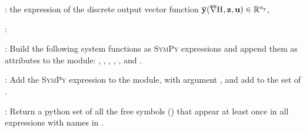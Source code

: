 \documentclass[10pt,a4paper]{article}
\begin{document}
\begin{description}
\begin{description}
\item {}: the expression of the discrete output vector function $\overline{{\mathbf{y}}}(\overline{\nabla}{\mathrm{H}}_{\mathtt{}}, {\mathbf{z}}, {\mathbf{u}})\in\mathbb{R}^{n_{\mathtt{y}}}$,
\end{description}
%
\item[Methods]:
%
\begin{description}
%
\item {}: Build the following system functions as \textsc{SymPy} expressions and append them as attributes to the  module: , , , , , and .
%
\item {}: Add the \textsc{SymPy} expression  to the  module, with argument 
, and add  to the set of .
%
\item {}: Return a python set of all the free symbols () that appear at least once in all expressions with names in .
\end{description}
%
\end{description}
%
\end{document}
